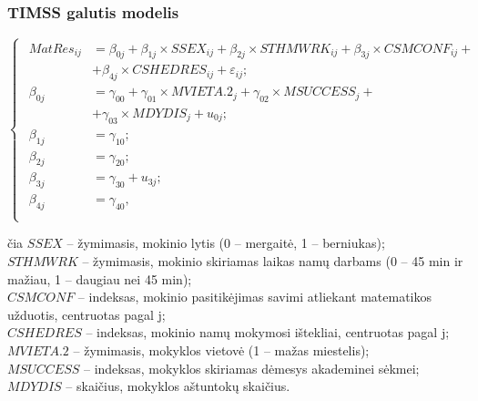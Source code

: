 \documentclass[utf8,hyperref={unicode,pdftex}]{beamer}
\begin{document}
\begin{frame}[shrink=20]
\frametitle{TIMSS galutis modelis}
\begin{equation*} \label{eq:timss2}
\left\{
\begin{array}{l}
\begin{split}
MatRes_{ij}&=\beta_{0j}+\beta_{1j}\times SSEX_{ij}+\beta_{2j} \times STHMWRK_{ij}+\beta_{3j}\times CSMCONF_{ij}+\\
&+\beta_{4j}\times CSHEDRES_{ij}+\varepsilon_{ij};\\
\beta_{0j}&=\gamma_{00}+\gamma_{01}\times MVIETA.2_j+\gamma_{02}\times MSUCCESS_j+\\
&+\gamma_{03}\times MDYDIS_j+u_{0j};\\
\beta_{1j}& = \gamma_{10};\\
\beta_{2j}&=\gamma_{20};\\
\beta_{3j}&=\gamma_{30}+u_{3j};\\
\beta_{4j}&=\gamma_{40},\\
\end{split}
\end{array} \right.
\end{equation*}

\noindent čia $SSEX$ -- žymimasis, mokinio lytis (0 -- mergaitė, 1 -- berniukas);\\
$STHMWRK$ -- žymimasis, mokinio skiriamas laikas namų darbams (0 -- 45 min ir mažiau, 1 -- daugiau nei 45 min);\\
$CSMCONF$ -- indeksas,  mokinio pasitikėjimas savimi atliekant matematikos užduotis, centruotas pagal j;\\
$CSHEDRES$ -- indeksas, mokinio namų mokymosi ištekliai, centruotas pagal j;\\
$MVIETA.2$ -- žymimasis, mokyklos vietovė (1 -- mažas miestelis);\\
$MSUCCESS$ -- indeksas, mokyklos skiriamas dėmesys akademinei sėkmei;\\
$MDYDIS$ -- skaičius, mokyklos aštuntokų skaičius.\\
\end{frame}
\end{document}
